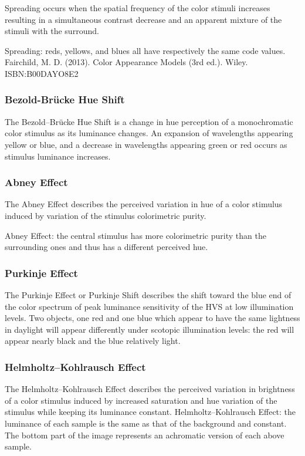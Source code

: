 Spreading occurs when the spatial frequency of the color stimuli increases resulting in a simultaneous contrast decrease and an apparent mixture of the stimuli with the surround.

Spreading: reds, yellows, and blues all have respectively the same code values.
Fairchild, M. D. (2013). Color Appearance Models (3rd ed.). Wiley. ISBN:B00DAYO8E2

\subsubsection{Bezold-Brücke Hue Shift}

The Bezold–Brücke Hue Shift is a change in hue perception of a monochromatic color stimulus as its luminance changes. An expansion of wavelengths appearing yellow or blue, and a decrease in wavelengths appearing green or red occurs as stimulus luminance increases.

\subsubsection{Abney Effect}

The Abney Effect describes the perceived variation in hue of a color stimulus induced by variation of the stimulus colorimetric purity.

Abney Effect: the central stimulus has more colorimetric purity than the surrounding ones and thus has a different perceived hue.

\subsubsection{Purkinje Effect}

The Purkinje Effect or Purkinje Shift describes the shift toward the blue end of the color spectrum of peak luminance sensitivity of the HVS at low illumination levels.
Two objects, one red and one blue which appear to have the same lightness in daylight will appear differently under scotopic illumination levels: the red will appear nearly black and the blue relatively light.

\subsubsection{Helmholtz–Kohlrausch Effect}

The Helmholtz–Kohlrausch Effect describes the perceived variation in brightness of a color stimulus induced by increased saturation and hue variation of the stimulus while keeping its luminance constant.
Helmholtz–Kohlrausch Effect: the luminance of each sample is the same as that of the background and constant. The bottom part of the image represents an achromatic version of each above sample.

